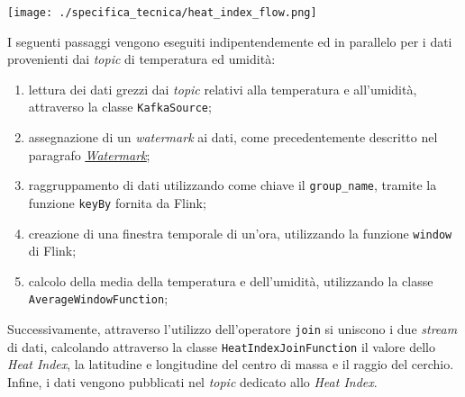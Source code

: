 \begin{center}
	\texttt{[image: ./specifica\_tecnica/heat\_index\_flow.png]}
\end{center}
I seguenti passaggi vengono eseguiti indipentendemente ed in parallelo per i dati provenienti dai \textit{topic} di temperatura ed umidità:
\begin{enumerate}
	\item lettura dei dati grezzi dai \textit{topic} relativi alla temperatura e all'umidità, attraverso la classe \texttt{KafkaSource};
	\item assegnazione di un \textit{watermark} ai dati, come precedentemente descritto nel paragrafo \hyperref[watermark]{\underline{\textit{Watermark}}};
	\item raggruppamento di dati utilizzando come chiave il \texttt{group\_name}, tramite la funzione \texttt{keyBy} fornita da Flink;
	\item creazione di una finestra temporale di un'ora, utilizzando la funzione \texttt{window} di Flink;
	\item calcolo della media della temperatura e dell'umidità, utilizzando la classe \\\texttt{AverageWindowFunction};
\end{enumerate}
Successivamente, attraverso l'utilizzo dell'operatore \texttt{join} si uniscono i due \textit{stream} di dati, calcolando
attraverso la classe \texttt{HeatIndexJoinFunction} il valore dello \textit{Heat Index}, la latitudine e longitudine del centro di massa e il raggio del cerchio.
Infine, i dati vengono pubblicati nel \textit{topic} dedicato allo \textit{Heat Index}.

